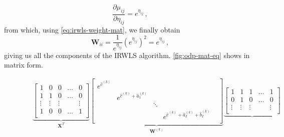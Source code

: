 \documentclass[a4paper]{book}
\begin{document}
\begin{equation}
  \frac{\partial \mu_{ij}}{\partial \eta_{ij}} = e^{\eta_{ij}} \,,
\end{equation}
from which, using \cref{eq:irwls-weight-mat}, we finally obtain
\begin{equation}
  \mathbf{W}_{ii} = \frac{1}{e^{\eta_{ij}}} (e^{\eta_{ij}})^2 = e^{\eta_{ij}} \,,
\end{equation}
giving us all the components of the IRWLS algorithm. \cref{fig:odp-mat-eq} shows in matrix form.

\begin{figure}
  \centering
  \large
  \begin{displaymath}
    \begin{split}
      &\underbrace{
        \begin{bmatrix}
          1      & 0      & 0      & \dots & 0      \\
          1      & 1      & 0      & \dots & 0      \\
          \vdots & \vdots & \vdots &       & \vdots \\
          1      & 0      & 0      & \dots & 1      \\
        \end{bmatrix}
      }_{\mathbf{X}^T}
      \underbrace{
        \begin{bmatrix}
          e^{\widehat{c}^{(k)}} &                                             &        &                                                                     \\
                                & e^{\widehat{c}^{(k)} + \widehat{a}^{(k)}_1} &        &                                                                   & \\
                                &                                             & \ddots &                                                                     \\
                                &                                             &        & e^{\widehat{c}^{(k)} + \widehat{a}^{(k)}_I + \widehat{b}^{(k)}_I}   \\
        \end{bmatrix}
      }_{\mathbf{W}^{(k)}}
      \underbrace{
        \begin{bmatrix}
          1      & 1      & 1      & \dots & 1      \\
          0      & 1      & 0      & \dots & 0      \\
          \vdots & \vdots & \vdots &       & \vdots \\

\end{bmatrix}}
\end{split}
\end{displaymath}
\end{figure}
\end{document}
